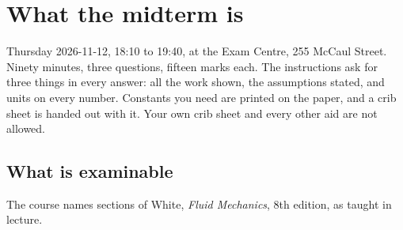\section{What the midterm is}
\label{sec:midterm}

Thursday 2026-11-12, 18:10 to 19:40, at the Exam Centre, 255 McCaul Street. Ninety minutes, three questions, fifteen marks each. The instructions ask for three things in every answer: all the work shown, the assumptions stated, and units on every number. Constants you need are printed on the paper, and a crib sheet is handed out with it. Your own crib sheet and every other aid are not allowed.

\subsection*{What is examinable}

The course names sections of White, \emph{Fluid Mechanics}, 8th edition, as taught in lecture.

